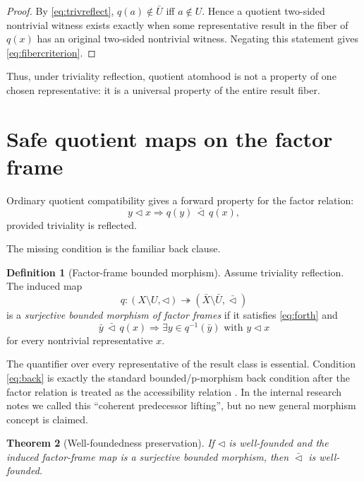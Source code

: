 \documentclass[11pt]{article}
\newtheorem{theorem}{Theorem}[section]
\theoremstyle{definition}
\newtheorem{definition}[theorem]{Definition}
\theoremstyle{remark}
\begin{document}
\begin{proof}
By \eqref{eq:trivreflect}, \(q(a)\notin\bar U\) iff \(a\notin U\). Hence a quotient two-sided nontrivial witness exists exactly when some representative result in the fiber of \(q(x)\) has an original two-sided nontrivial witness. Negating this statement gives \eqref{eq:fibercriterion}.
\end{proof}

Thus, under triviality reflection, quotient atomhood is not a property of one chosen representative: it is a universal property of the entire result fiber.

\section{Safe quotient maps on the factor frame}

Ordinary quotient compatibility gives a forward property for the factor relation:
\begin{equation}
y\triangleleft x\Longrightarrow q(y)\,\bar\triangleleft\,q(x),
\label{eq:forth}
\end{equation}
provided triviality is reflected.

The missing condition is the familiar back clause.

\begin{definition}[Factor-frame bounded morphism]
Assume triviality reflection. The induced map
\[
q:(X\setminus U,\triangleleft)\twoheadrightarrow
(\bar X\setminus\bar U,\bar\triangleleft)
\]
is a \emph{surjective bounded morphism of factor frames} if it satisfies \eqref{eq:forth} and
\begin{equation}
\boxed{
\bar y\,\bar\triangleleft\,q(x)
\Longrightarrow
\exists y\in q^{-1}(\bar y)\text{ with }y\triangleleft x
}
\label{eq:back}
\end{equation}
for every nontrivial representative \(x\).
\end{definition}

The quantifier over every representative of the result class is essential. Condition \eqref{eq:back} is exactly the standard bounded/p-morphism back condition after the factor relation is treated as the accessibility relation \cite{BlackburnDeRijkeVenema2001}. In the internal research notes we called this ``coherent predecessor lifting'', but no new general morphism concept is claimed.

\begin{theorem}[Well-foundedness preservation]
If \(\triangleleft\) is well-founded and the induced factor-frame map is a surjective bounded morphism, then \(\bar\triangleleft\) is well-founded.
\end{theorem}
\end{document}
